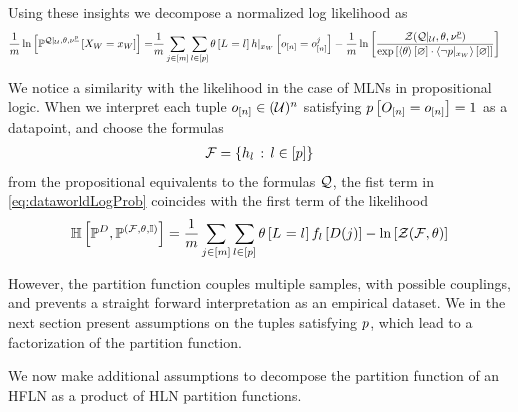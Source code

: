 Using these insights we decompose a normalized log likelihood as
\begin{align}
    \label{eq:dataworldLogProb}
    \frac{1}{m} \ln \left[ \mathbb{P}^{{\mathcal{Q}}|_{\mathcal{U}},\theta,\nu^{\underline{p}}}\left[X_{W}=x_{W}\right] \right]
    = & \frac{1}{m} \sum_{j\in[m]} \sum_{l\in[p]} \theta\left[L_{}=l_{}\right]
    {h}|_{x_{W}} \left[o_{[n]} = o_{[n]}^{j}\right]
    - \frac{1}{m} \ln \left[ 
        \frac{\mathcal{Z}{\left({\mathcal{Q}}|_{\mathcal{U}},\theta,\nu^{\underline{p}}\right)}}{
            \mathrm{exp}\left[\left\langle \theta\right\rangle \left[ \varnothing \right] \cdot \left\langle {\lnot p}|_{x_{W}}\right\rangle \left[ \varnothing \right]\right]
        }
     \right]
\end{align}

We notice a similarity with the likelihood in the case of MLNs in propositional logic.
When we interpret each tuple $o_{[n]}\in(\mathcal{U})^{n}$ satisfying $p\left[O_{[n]}=o_{[n]}\right]=1$ as a datapoint, and choose the formulas
\begin{align*}
    \mathcal{F} = \{h_{l} \, : \, l\in[p] \}
\end{align*}
from the propositional equivalents to the formulas $\mathcal{Q}$, the fist term in \eqref{eq:dataworldLogProb} coincides with the first term of the likelihood
\begin{align*}
    \mathbb{H}\left[\mathbb{P}^{D},\mathbb{P}^{(\mathcal{F},\theta,\mathbb{I})}\right]
    = \frac{1}{m}\sum_{j\in[m]} \sum_{l\in[p]} \theta\left[L_{}=l_{}\right] f_{l}\left[D(j)\right] - \ln \left[ \mathcal{Z}{\left(\mathcal{F},\theta\right)} \right]
\end{align*}

However, the partition function couples multiple samples, with possible couplings, and prevents a straight forward interpretation as an empirical dataset.
We in the next section present assumptions on the tuples satisfying $p$, which lead to a factorization of the partition function.



We now make additional assumptions to decompose the partition function of an HFLN as a product of HLN partition functions.

